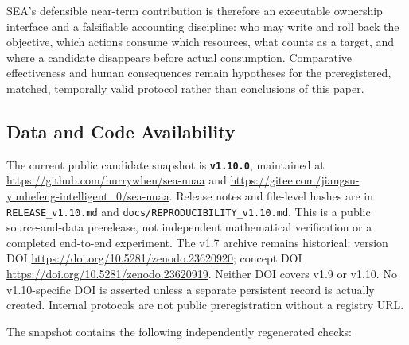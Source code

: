 \documentclass[
  11pt]{article}
\begin{document}
SEA's defensible near-term contribution is therefore an executable
ownership interface and a falsifiable accounting discipline: who may
write and roll back the objective, which actions consume which
resources, what counts as a target, and where a candidate disappears
before actual consumption. Comparative effectiveness and human
consequences remain hypotheses for the preregistered, matched,
temporally valid protocol rather than conclusions of this paper.

\subsection{Data and Code
Availability}\label{data-and-code-availability}

The current public candidate snapshot is \textbf{\texttt{v1.10.0}},
maintained at \url{https://github.com/hurrywhen/sea-nuaa} and
\url{https://gitee.com/jiangsu-yunhefeng-intelligent_0/sea-nuaa}.
Release notes and file-level hashes are in \texttt{RELEASE\_v1.10.md}
and \texttt{docs/REPRODUCIBILITY\_v1.10.md}. This is a public
source-and-data prerelease, not independent mathematical verification or
a completed end-to-end experiment. The v1.7 archive remains historical:
version DOI \url{https://doi.org/10.5281/zenodo.23620920}; concept DOI
\url{https://doi.org/10.5281/zenodo.23620919}. Neither DOI covers v1.9
or v1.10. No v1.10-specific DOI is asserted unless a separate persistent
record is actually created. Internal protocols are not public
preregistration without a registry URL.

The snapshot contains the following independently regenerated checks:
\end{document}
